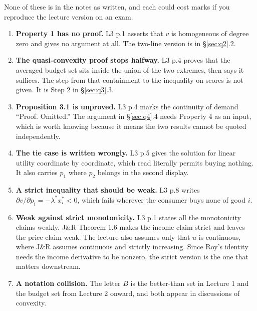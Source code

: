 \documentclass[11pt,letterpaper]{article}
\theoremstyle{definition}
\theoremstyle{plain}
\begin{document}
None of these is in the notes as written, and each could cost marks if you reproduce the lecture
version on an exam.

\begin{enumerate}[leftmargin=*,itemsep=3pt]
\item \textbf{Property 1 has no proof.} L3 p.1 asserts that $v$ is homogeneous of degree zero and
gives no argument at all. The two-line version is in \S\ref{sec:q2}.2.

\item \textbf{The quasi-convexity proof stops halfway.} L3 p.4 proves that the averaged budget set
sits inside the union of the two extremes, then says it suffices. The step from that containment to
the inequality on scores is not given. It is Step 2 in \S\ref{sec:q3}.3.

\item \textbf{Proposition 3.1 is unproved.} L3 p.4 marks the continuity of demand ``Proof. Omitted.''
The argument in \S\ref{sec:q4}.4 needs Property 4 as an input, which is worth knowing because it
means the two results cannot be quoted independently.

\item \textbf{The tie case is written wrongly.} L3 p.5 gives the solution for linear utility
coordinate by coordinate, which read literally permits buying nothing. It also carries $p_1$ where
$p_2$ belongs in the second display.

\item \textbf{A strict inequality that should be weak.} L3 p.8 writes
$\partial v / \partial p_i = -\lambda^* x_i^* < 0$, which fails wherever the consumer buys none of
good $i$.

\item \textbf{Weak against strict monotonicity.} L3 p.1 states all the monotonicity claims weakly.
J\&R Theorem 1.6 makes the income claim strict and leaves the price claim weak. The lecture also
assumes only that $u$ is continuous, where J\&R assumes continuous and strictly increasing. Since
Roy's identity needs the income derivative to be nonzero, the strict version is the one that matters
downstream.

\item \textbf{A notation collision.} The letter $B$ is the better-than set in Lecture 1 and the
budget set from Lecture 2 onward, and both appear in discussions of convexity.
\end{enumerate}
\end{document}
